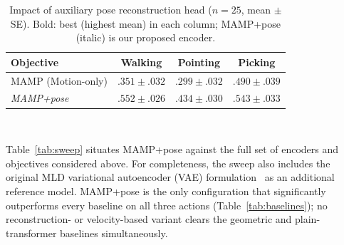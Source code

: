 \documentclass[letterpaper]{article} %
\begin{document}

\begin{table}[htbp]
\centering
\setlength{\tabcolsep}{4pt}
\small
\caption{Impact of auxiliary pose reconstruction head ($n=25$, mean $\pm$ SE).
Bold: best (highest mean) in each column; MAMP+pose (italic) is our proposed encoder.}
\begin{tabular}{lccc}
\toprule
Objective & Walking & Pointing & Picking \\
\midrule
MAMP (Motion-only) & $.351{\scriptstyle\pm}.032$ & $.299{\scriptstyle\pm}.032$ & $.490{\scriptstyle\pm}.039$ \\
\textit{MAMP+pose} & $\mathbf{.552{\scriptstyle\pm}.026}$ & $\mathbf{.434{\scriptstyle\pm}.030}$ & $\mathbf{.543{\scriptstyle\pm}.033}$ \\
\bottomrule
\end{tabular}~\label{tab:posehead}
\end{table}




Table~\ref{tab:sweep} situates MAMP+pose against the full set of encoders and objectives considered above.  For completeness, the sweep also includes the original MLD variational autoencoder (VAE) formulation~\citep{chen2023mld} as an additional reference model.
 MAMP+pose is the only configuration that significantly outperforms every baseline on all three actions (Table~\ref{tab:baselines}); no reconstruction- or velocity-based variant clears the geometric and plain-transformer baselines simultaneously.
\end{document}
